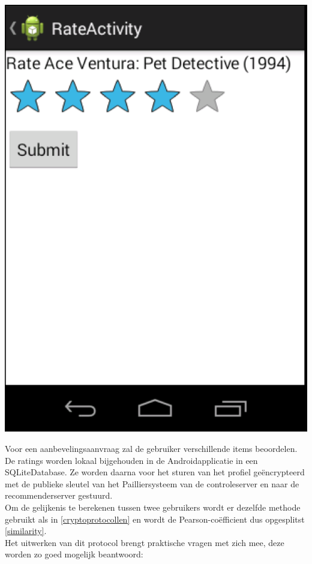 \begin{center}
\centering
\includegraphics[scale=0.5]{fig/rate_item}

    \label{rate_item} 
 
\end{center}
Voor een aanbevelingsaanvraag zal de gebruiker verschillende items beoordelen. De ratings worden lokaal bijgehouden in de Androidapplicatie in een SQLiteDatabase. Ze worden daarna voor het sturen van het profiel ge\"encrypteerd met de publieke sleutel van het Pailliersysteem van de controleserver en naar de recommenderserver gestuurd. \\Om de gelijkenis te berekenen tussen twee gebruikers wordt er dezelfde methode gebruikt als in \ref{cryptoprotocollen} en wordt de Pearson-co\"efficient dus opgesplitst \eqref{similarity}.\\ Het uitwerken van dit protocol brengt praktische vragen met zich mee, deze worden zo goed mogelijk beantwoord:
